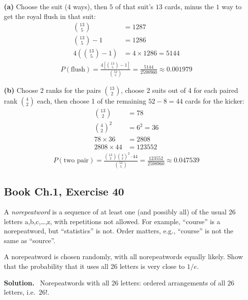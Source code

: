 \documentclass[11pt]{article}
\newcommand{\Sol}{\vspace{2pt}\noindent\textbf{Solution.}\ }
\begin{document}
\textbf{(a)} Choose the suit ($4$ ways), then $5$ of that suit's $13$ cards, minus the $1$ way to get the royal flush in that suit:
\begin{align*}
\binom{13}{5} &= 1287\\
\binom{13}{5}-1 &= 1286\\
4\left(\binom{13}{5}-1\right) &= 4\times 1286 = 5144
\end{align*}
\begin{align*}
P(\text{flush}) = \frac{4\left[\binom{13}{5}-1\right]}{\binom{52}{5}} = \frac{5144}{2598960} \approx 0.001979
\end{align*}

\textbf{(b)} Choose 2 ranks for the pairs $\binom{13}{2}$, choose 2 suits out of 4 for each paired rank $\binom{4}{2}$ each, then choose 1 of the remaining $52-8=44$ cards for the kicker:
\begin{align*}
\binom{13}{2} &= 78\\
\binom{4}{2}^2 &= 6^2 = 36\\
78\times 36 &= 2808\\
2808\times 44 &= 123552
\end{align*}
\begin{align*}
P(\text{two pair}) = \frac{\binom{13}{2}\binom{4}{2}^2\cdot 44}{\binom{52}{5}} = \frac{123552}{2598960} \approx 0.047539
\end{align*}

\subsection{Book Ch.1, Exercise 40}
\begin{qbox}
A \emph{norepeatword} is a sequence of at least one (and possibly all) of the usual 26 letters a,b,c,\dots,z, with repetitions not allowed. For example, ``course'' is a norepeatword, but ``statistics'' is not. Order matters, e.g., ``course'' is not the same as ``source''.

A norepeatword is chosen randomly, with all norepeatwords equally likely. Show that the probability that it uses all 26 letters is very close to $1/e$.
\end{qbox}
\Sol
Norepeatwords with all 26 letters: ordered arrangements of all 26 letters, i.e.\ $26!$.
\end{document}
